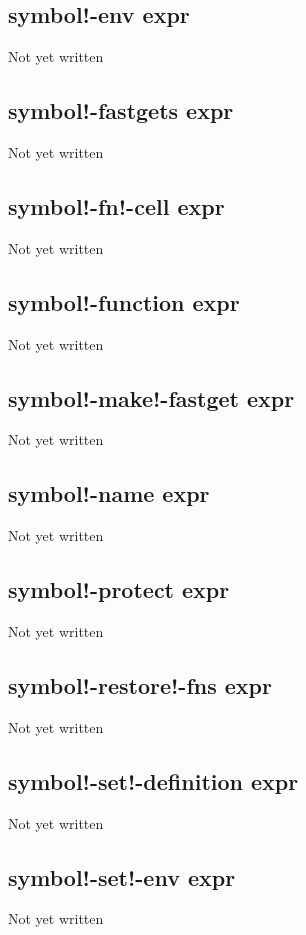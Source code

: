 \documentclass[a4paper,11pt]{article}
\begin{document}
{\subsection{\ttfamily symbol!-env expr}
   Not yet written

\subsection{\ttfamily symbol!-fastgets expr}
   Not yet written

\subsection{\ttfamily symbol!-fn!-cell expr}
   Not yet written

\subsection{\ttfamily symbol!-function expr}
   Not yet written

\subsection{\ttfamily symbol!-make!-fastget expr}
   Not yet written

\subsection{\ttfamily symbol!-name expr}
   Not yet written

\subsection{\ttfamily symbol!-protect expr}
   Not yet written

\subsection{\ttfamily symbol!-restore!-fns expr}
   Not yet written

\subsection{\ttfamily symbol!-set!-definition expr}
   Not yet written

\subsection{\ttfamily symbol!-set!-env expr}
   Not yet written

}
\end{document}
